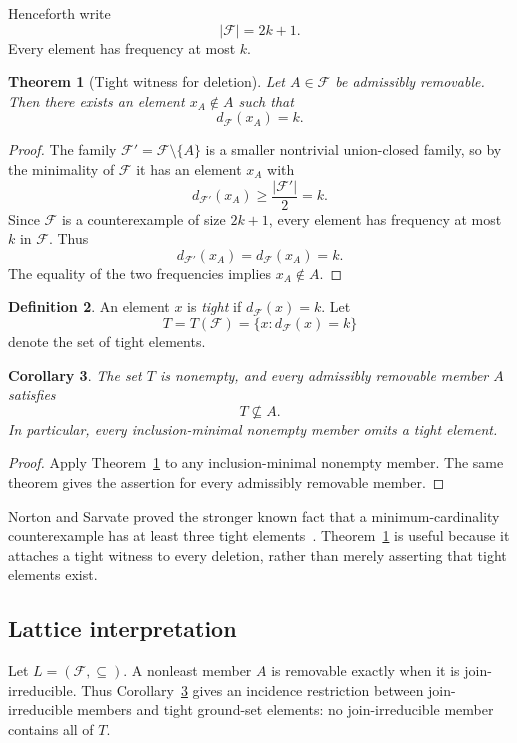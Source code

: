 \documentclass[11pt]{amsart}
\newtheorem{theorem}{Theorem}[section]
\newtheorem{corollary}[theorem]{Corollary}
\theoremstyle{definition}
\newtheorem{definition}[theorem]{Definition}
\theoremstyle{remark}
\newcommand{\F}{\mathcal F}
\begin{document}
Henceforth write
\[
  |\F|=2k+1.
\]
Every element has frequency at most $k$.

\begin{theorem}[Tight witness for deletion]\label{thm:tight-witness}
Let $A\in\F$ be admissibly removable. Then there exists an element $x_A\notin A$ such that
\[
  d_{\F}(x_A)=k.
\]
\end{theorem}

\begin{proof}
The family $\F' = \F\setminus\{A\}$ is a smaller nontrivial union-closed family, so by the minimality of $\F$ it has an element $x_A$ with
\[
  d_{\F'}(x_A)\ge \frac{|\F'|}{2}=k.
\]
Since $\F$ is a counterexample of size $2k+1$, every element has frequency at most $k$ in $\F$. Thus
\[
  d_{\F'}(x_A)=d_{\F}(x_A)=k.
\]
The equality of the two frequencies implies $x_A\notin A$.
\end{proof}

\begin{definition}
An element $x$ is \emph{tight} if $d_{\F}(x)=k$. Let
\[
  T=T(\F)=\{x:d_{\F}(x)=k\}
\]
denote the set of tight elements.
\end{definition}

\begin{corollary}\label{cor:removable-omits-tight}
The set $T$ is nonempty, and every admissibly removable member $A$ satisfies
\[
  T\nsubseteq A.
\]
In particular, every inclusion-minimal nonempty member omits a tight element.
\end{corollary}

\begin{proof}
Apply Theorem~\ref{thm:tight-witness} to any inclusion-minimal nonempty member. The same theorem gives the assertion for every admissibly removable member.
\end{proof}

Norton and Sarvate proved the stronger known fact that a minimum-cardinality counterexample has at least three tight elements~\cite{NortonSarvate1993}. Theorem~\ref{thm:tight-witness} is useful because it attaches a tight witness to every deletion, rather than merely asserting that tight elements exist.

\subsection{Lattice interpretation}

Let $L=(\F,\subseteq)$. A nonleast member $A$ is removable exactly when it is join-irreducible. Thus Corollary~\ref{cor:removable-omits-tight} gives an incidence restriction between join-irreducible members and tight ground-set elements: no join-irreducible member contains all of $T$.
\end{document}
